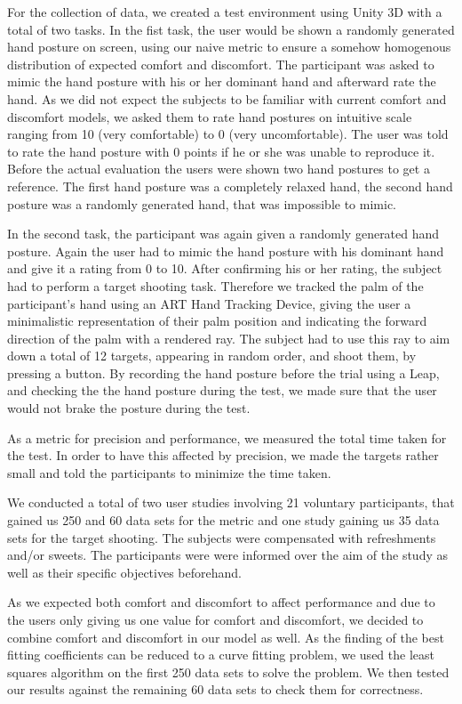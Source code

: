 \documentclass{sig-alternate-05-2015}
\begin{document}
For the collection of data, we created a test environment using Unity 3D with a total of two tasks. In the fist task, the user would be shown a randomly generated hand posture on screen, using our naive metric to ensure a somehow homogenous distribution of expected comfort and discomfort. The participant was asked to mimic the hand posture with his or her dominant hand and afterward rate the hand. As we did not expect the subjects to be familiar with current comfort and discomfort models, we asked them to rate hand postures on intuitive scale ranging from 10 (very comfortable) to 0 (very uncomfortable). The user was told to rate the hand posture with 0 points if he or she was unable to reproduce it. Before the actual evaluation the users were shown two hand postures to get a reference. The first hand posture was a completely relaxed hand, the second hand posture was a randomly generated hand, that was impossible to mimic.

In the second task, the participant was again given a randomly generated hand posture. Again the user had to mimic the hand posture with his dominant hand and give it a rating from 0 to 10. After confirming his or her rating, the subject had to perform a target shooting task. Therefore we tracked the palm of the participant's hand using an ART Hand Tracking Device, giving the user a minimalistic representation of their palm position and indicating the forward direction of the palm with a rendered ray. The subject had to use this ray to aim down a total of 12 targets, appearing in random order, and shoot them, by pressing a button. By recording the hand posture before the trial using a Leap, and checking the the hand posture during the test, we made sure that the user would not brake the posture during the test. 

As a metric for precision and performance, we measured the total time taken for the test. In order to have this affected by precision, we made the targets rather small and told the participants to minimize the time taken.

We conducted a total of two user studies involving 21 voluntary participants, that gained us 250 and 60 data sets for the metric and one study gaining us 35 data sets for the target shooting. The subjects were compensated with refreshments and/or sweets.
The participants were were informed over the aim of the study as well as their specific objectives beforehand.

As we expected both comfort and discomfort to affect performance and due to the users only giving us one value for comfort and discomfort, we decided to combine comfort and discomfort in our model as well. As the finding of the best fitting coefficients can be reduced to a curve fitting problem, we used the least squares algorithm on the first 250 data sets to solve the problem. We then tested our results against the remaining 60 data sets to check them for correctness. 
\end{document}
